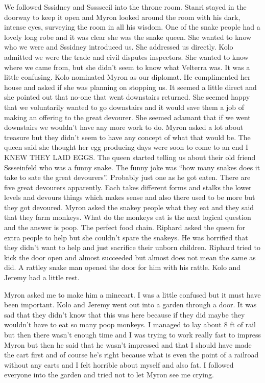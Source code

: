 \begin{multicols}{2}
We followed Sssidney and Sssssecil into the throne room. Stanri stayed in the doorway to keep it open and Myron looked around the room with his dark, intense eyes, surveying the room in all his wisdom. One of the snake people had a lovely long robe and it was clear she was the snake queen. She wanted to know who we were and Sssidney introduced us. She addressed us directly. Kolo admitted we were the trade and civil disputes inspectors. She wanted to know where we came from, but she didn’t seem to know what Velterra was. It was a little confusing. Kolo nominated Myron as our diplomat. He complimented her house and asked if she was planning on stopping us. It seemed a little direct and she pointed out that no-one that went downstairs returned. She seemed happy that we voluntarily wanted to go downstairs and it would save them a job of making an offering to the great devourer. She seemed adamant that if we went downstairs we wouldn’t have any more work to do. Myron asked a lot about treasure but they didn’t seem to have any concept of what that would be. The queen said she thought her egg producing days were soon to come to an end I KNEW THEY LAID EGGS. The queen started telling us about their old friend Sssseinfeld who was a funny snake. The funny joke was “how many snakes does it take to sate the great devourers”. Probably just one as he got eaten. There are five great devourers apparently. Each takes different forms and stalks the lower levels and devours things which makes sense and also there used to be more but they got devoured. Myron asked the snakey people what they eat and they said that they farm monkeys. What do the monkeys eat is the next logical question and the answer is poop. The perfect food chain. Riphard asked the queen for extra people to help but she couldn’t spare the snakeys. He was horrified that they didn’t want to help and just sacrifice their unborn children. Riphard tried to kick the door open and almost succeeded but almost does not mean the same as did. A rattley snake man opened the door for him with his rattle. Kolo and Jeremy had a little rest.\medskip

Myron asked me to make him a minecart. I was a little confused but it must have been important. Kolo and Jeremy went out into a garden through a door. It was sad that they didn’t know that this was here because if they did maybe they wouldn’t have to eat so many poop monkeys. I managed to lay about 8 ft of rail but then there wasn’t enough time and I was trying to work really fast to impress Myron but then he said that he wasn’t impressed and that I should have made the cart first and of course he’s right because what is even the point of a railroad without any carts and I felt horrible about myself and also fat. I followed everyone into the garden and tried not to let Myron see me crying.\medskip


\end{multicols}

